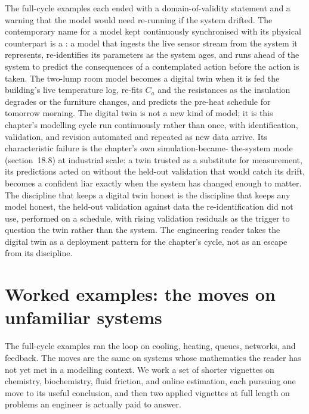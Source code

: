 \begin{mastery}
The full-cycle examples each ended with a domain-of-validity statement and
a warning that the model would need re-running if the system drifted. The
contemporary name for a model kept continuously synchronised with its
physical counterpart is a : a model that ingests the
live sensor stream from the system it represents, re-identifies its
parameters as the system ages, and runs ahead of the system to predict the
consequences of a contemplated action before the action is taken. The
two-lump room model becomes a digital twin when it is fed the building's
live temperature log, re-fits $C_a$ and the resistances as the insulation
degrades or the furniture changes, and predicts the pre-heat schedule for
tomorrow morning. The digital twin is not a new kind of model; it is this
chapter's modelling cycle run continuously rather than once, with
identification, validation, and revision automated and repeated as new data
arrive. Its characteristic failure is the chapter's own simulation-became-
the-system mode (section~18.8) at industrial scale: a twin trusted as a
substitute for measurement, its predictions acted on without the held-out
validation that would catch its drift, becomes a confident liar exactly
when the system has changed enough to matter. The discipline that keeps a
digital twin honest is the discipline that keeps any model honest, the
held-out validation against data the re-identification did not use,
performed on a schedule, with rising validation residuals as the trigger to
question the twin rather than the system. The engineering reader takes the
digital twin as a deployment pattern for the chapter's cycle, not as an
escape from its discipline.
\end{mastery}

\section{Worked examples: the moves on unfamiliar systems}

The full-cycle examples ran the loop on cooling, heating, queues, networks,
and feedback. The moves are the same on systems whose mathematics the
reader has not yet met in a modelling context. We work a set of shorter
vignettes on chemistry, biochemistry, fluid friction, and online
estimation, each pursuing one move to its useful conclusion, and then two
applied vignettes at full length on problems an engineer is actually paid
to answer.

